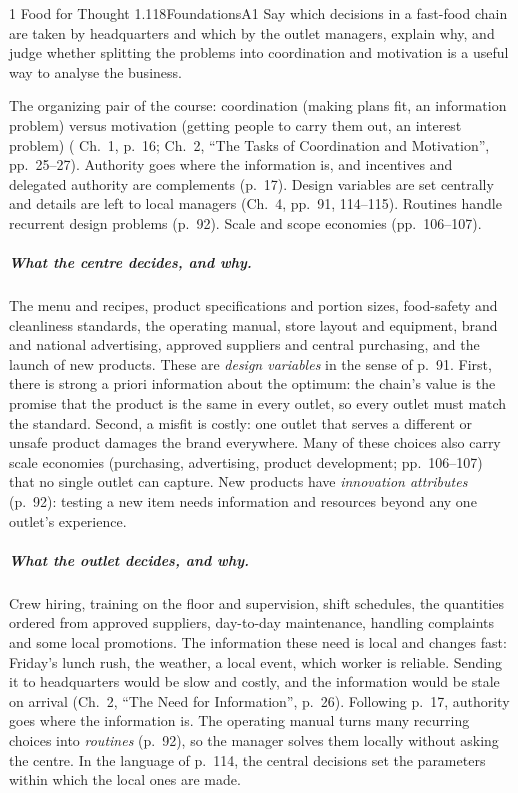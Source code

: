 \begin{exsol}{1}{\MR{} Food for Thought 1.1}{18}{Foundations}{A1}
\asked Say which decisions in a fast-food chain are taken by headquarters and which by the outlet
managers, explain why, and judge whether splitting the problems into coordination and motivation
is a useful way to analyse the business.

\method The organizing pair of the course: coordination (making plans fit, an information problem)
versus motivation (getting people to carry them out, an interest problem) (\MR{} Ch.~1, p.~16;
Ch.~2, ``The Tasks of Coordination and Motivation'', pp.~25--27). Authority goes where the
information is, and incentives and delegated authority are complements (p.~17). Design variables
are set centrally and details are left to local managers (Ch.~4, pp.~91, 114--115). Routines handle
recurrent design problems (p.~92). Scale and scope economies (pp.~106--107).

\solution
\subparagraph{What the centre decides, and why.} The menu and recipes, product specifications and
portion sizes, food-safety and cleanliness standards, the operating manual, store layout and
equipment, brand and national advertising, approved suppliers and central purchasing, and the
launch of new products. These are \emph{design variables} in the sense of p.~91. First, there is
strong a priori information about the optimum: the chain's value is the promise that the product
is the same in every outlet, so every outlet must match the standard. Second, a misfit is costly:
one outlet that serves a different or unsafe product damages the brand everywhere. Many of these
choices also carry scale economies (purchasing, advertising, product development; pp.~106--107)
that no single outlet can capture. New products have \emph{innovation attributes} (p.~92): testing a
new item needs information and resources beyond any one outlet's experience.

\subparagraph{What the outlet decides, and why.} Crew hiring, training on the floor and
supervision, shift schedules, the quantities ordered from approved suppliers, day-to-day
maintenance, handling complaints and some local promotions. The information these need is local
and changes fast: Friday's lunch rush, the weather, a local event, which worker is reliable. Sending
it to headquarters would be slow and costly, and the information would be stale on arrival
(Ch.~2, ``The Need for Information'', p.~26). Following p.~17, authority goes where the
information is. The operating manual turns many recurring choices into \emph{routines} (p.~92),
so the manager solves them locally without asking the centre. In the language of p.~114, the
central decisions set the parameters within which the local ones are made.


\end{exsol}
